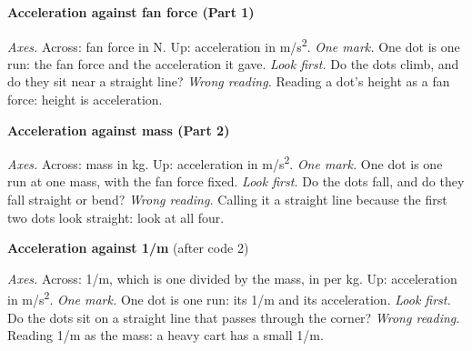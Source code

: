 \documentclass[10pt]{article}
\begin{document}
\textbf{Acceleration against fan force (Part 1)}\par \textit{Axes.} Across: fan force in N. Up: acceleration in m/s\textsuperscript{2}. \textit{One mark.} One dot is one run: the fan force and the acceleration it gave. \textit{Look first.} Do the dots climb, and do they sit near a straight line? \textit{Wrong reading.} Reading a dot's height as a fan force: height is acceleration.\par\medskip
\textbf{Acceleration against mass (Part 2)}\par \textit{Axes.} Across: mass in kg. Up: acceleration in m/s\textsuperscript{2}. \textit{One mark.} One dot is one run at one mass, with the fan force fixed. \textit{Look first.} Do the dots fall, and do they fall straight or bend? \textit{Wrong reading.} Calling it a straight line because the first two dots look straight: look at all four.\par\medskip
\textbf{Acceleration against 1/m} (after code 2)\par \textit{Axes.} Across: 1/m, which is one divided by the mass, in per kg. Up: acceleration in m/s\textsuperscript{2}. \textit{One mark.} One dot is one run: its 1/m and its acceleration. \textit{Look first.} Do the dots sit on a straight line that passes through the corner? \textit{Wrong reading.} Reading 1/m as the mass: a heavy cart has a small 1/m.\par\medskip
\end{document}
